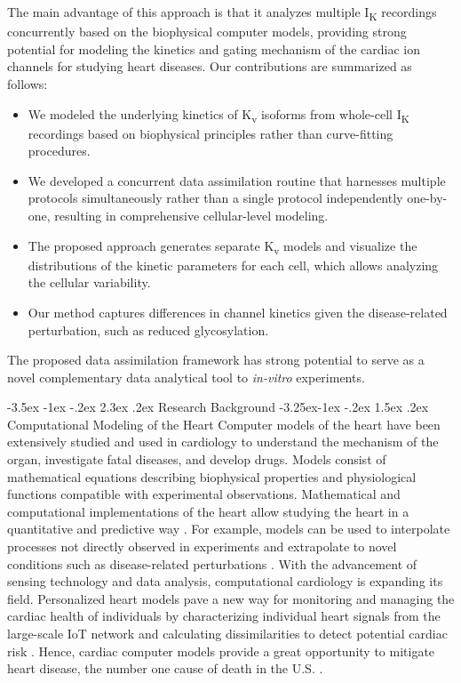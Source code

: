 \documentclass[11pt]{article}
\makeatletter
\renewcommand\section{\@startsection {section}{1}{\z@}%
                                   {-3.5ex \@plus -1ex \@minus -.2ex}%
                                   {2.3ex \@plus.2ex}%
                                   {\normalfont\fontfamily{phv}\fontsize{16}{19}\bfseries}}
\renewcommand\subsection{\@startsection{subsection}{2}{\z@}%
                                     {-3.25ex\@plus -1ex \@minus -.2ex}%
                                     {1.5ex \@plus .2ex}%
                                     {\normalfont\fontfamily{phv}\fontsize{14}{17}\bfseries}}
\makeatother
\begin{document}
The main advantage of this approach is that it analyzes multiple I\textsubscript{K} recordings concurrently based on the biophysical computer models, providing strong potential for modeling the kinetics and gating mechanism of the cardiac ion channels for studying heart diseases. Our contributions are summarized as follows:
\begin{itemize}
    \item We modeled the underlying kinetics of K\textsubscript{v} isoforms from whole-cell I\textsubscript{K} recordings based on biophysical principles rather than curve-fitting procedures.
    \item We developed a concurrent data assimilation routine that harnesses multiple protocols simultaneously rather than a single protocol independently one-by-one, resulting in comprehensive cellular-level modeling.
    \item The proposed approach generates separate K\textsubscript{v} models and visualize the distributions of the kinetic parameters for each cell, which allows analyzing the cellular variability. 
    \item Our method captures differences in channel kinetics given the disease-related perturbation, such as reduced glycosylation.
\end{itemize}
The proposed data assimilation framework has strong potential to serve as a novel complementary data analytical tool to \textit{in-vitro} experiments. 

\section{Research Background}
\subsection{Computational Modeling of the Heart}
Computer models of the heart have been extensively studied and used in cardiology to understand the mechanism of the organ, investigate fatal diseases, and develop drugs. Models consist of mathematical equations describing biophysical properties and physiological functions compatible with experimental observations. Mathematical and computational implementations of the heart allow studying the heart in a quantitative and predictive way \citep{whittaker2020calibration}. For example, models can be used to interpolate processes not directly observed in experiments and extrapolate to novel conditions such as disease-related perturbations \citep{rodriguez2010systems}. With the advancement of sensing technology and data analysis, computational cardiology is expanding its field. Personalized heart models pave a new way for monitoring and managing the cardiac health of individuals by characterizing individual heart signals from the large-scale IoT network and calculating dissimilarities to detect potential cardiac risk \citep{yang2020network}. Hence, cardiac computer models provide a great opportunity to mitigate heart disease, the number one cause of death in the U.S. \citep{murphy2021mortality}.
\end{document}
